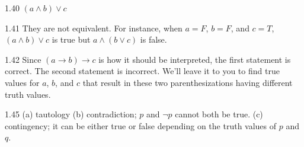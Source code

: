 \begin{Answer}{1.40}
$(a \wedge  b)\vee c$
\end{Answer}
\begin{Answer}{1.41}
They are not equivalent.  For instance, when $a=F$, $b=F$, and $c=T$, $(a\wedge b)\vee c$ is true
but $a \wedge ( b\vee c)$ is false.
\end{Answer}
\begin{Answer}{1.42}
Since $(a \rightarrow b) \rightarrow c$ is how it should be interpreted, the first statement is correct.
The second statement is incorrect.  We'll leave it to you to find true values for $a$, $b$, and $c$
that result in these two parenthesizations having different truth values.
\end{Answer}
\begin{Answer}{1.45}
(a) tautology (b) contradiction;  $p$ and $\neg p$ cannot both be true.
(c) contingency; it can be either true or false depending on the truth values of $p$ and $q$.
\end{Answer}
